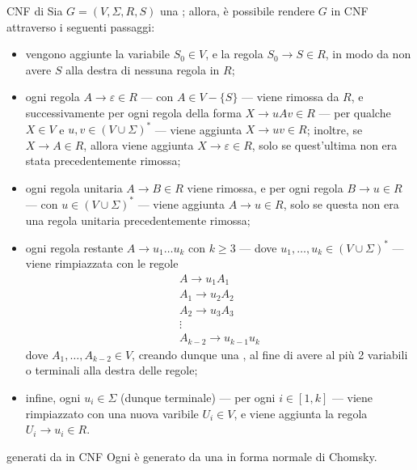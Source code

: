 \documentclass[a4paper, 12pt]{report}
\begin{document}
    \begin{framedmeth}[label={cfg into cnf}]{CNF di \CFG}
        Sia $G = (V, \Sigma, R, S)$ una \CFG; allora, è possibile rendere $G$ in CNF attraverso i seguenti passaggi:

        \begin{itemize}
            \item vengono aggiunte la variabile $S_0 \in V$, e la regola $S_0 \to S \in R$, in modo da non avere $S$ alla destra di nessuna regola in $R$;
            \item ogni regola $A \to \varepsilon \in R$ --- con $A \in V - \{S\}$ --- viene rimossa da $R$, e successivamente per ogni regola della forma $X \to uAv \in R$ --- per qualche $X \in V$ e $u, v \in (V \cup \Sigma)^*$ --- viene aggiunta $X \to uv \in R$; inoltre, se $X \to A \in R$, allora viene aggiunta $X \to \varepsilon \in R$, solo se quest'ultima non era stata precedentemente rimossa;
            \item ogni regola unitaria $A \to B \in R$ viene rimossa, e per ogni regola $B \to u \in R$ --- con $u \in (V \cup \Sigma)^*$ --- viene aggiunta $A \to u \in R$, solo se questa non era una regola unitaria precedentemente rimossa;
            \item ogni regola restante $A \to u_1 \ldots u_k$ con $k \ge 3$ --- dove $u_1, \ldots, u_k \in (V \cup \Sigma)^*$ --- viene rimpiazzata con le regole $$\left . \begin{array}{c} A \to u_1 A_1  \\ A_1 \to u_2 A_2 \\ A_2 \to u_3 A_3 \\ \vdots \\ A_{k - 2} \to u_{k - 1}u_k \end{array} \right .$$ dove $A_1, \ldots, A_{k - 2} \in V$, creando dunque una , al fine di avere al più 2 variabili o terminali alla destra delle regole;
            \item infine, ogni $u_i \in \Sigma$ (dunque terminale) --- per ogni $i \in [1, k]$ --- viene rimpiazzato con una nuova varibile $U_i \in V$, e viene aggiunta la regola $U_i \to u_i \in R$.
        \end{itemize}
    \end{framedmeth}

    \begin{framedlem}{\CFL generati da \CFG in CNF}
        Ogni \CFL è generato da una \CFG in forma normale di Chomsky.
    \end{framedlem}
\end{document}

